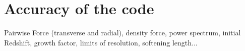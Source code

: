 \section{Accuracy of the code}

Pairwise Force (transverse and radial), density force, power spectrum, initial Redshift, 
growth factor, limits of resolution, softening length...
